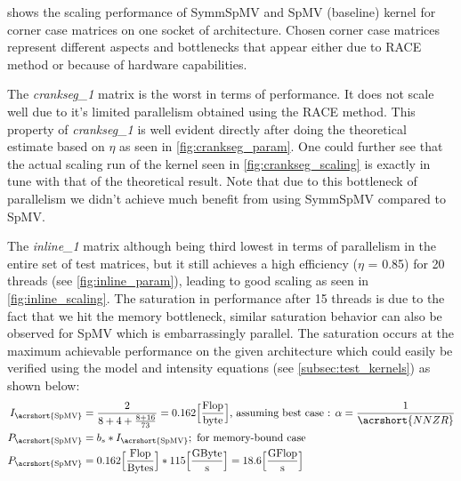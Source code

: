  shows the scaling performance of \acrshort{SymmSpMV} and \acrshort{SpMV} (baseline) kernel for corner case matrices on one socket of \SKX architecture. Chosen corner case matrices represent different aspects and bottlenecks that appear either due to \acrshort{RACE} method or because of hardware capabilities.

The \emph{crankseg\_1} matrix is the worst in terms of performance. It does not scale well due to it's limited parallelism obtained using the \acrshort{RACE} method. This property of \emph{crankseg\_1} is well evident directly after doing the theoretical estimate based on $\eta$ as  seen in \cref{fig:crankseg_param}. One could further see that the actual scaling run of the kernel seen in \cref{fig:crankseg_scaling} is exactly in tune with that of the theoretical result. Note that due to this bottleneck of parallelism we didn't achieve much benefit from using \acrshort{SymmSpMV} compared to \acrshort{SpMV}.

The \emph{inline\_1} matrix although being third lowest in terms of parallelism in the entire set of test matrices, but it still achieves a high efficiency ($\eta$ = 0.85) for 20 threads (see \cref{fig:inline_param}), leading to good scaling as seen in \cref{fig:inline_scaling}. The saturation in performance after 15 threads is due to the fact that we hit the memory bottleneck, similar saturation behavior can also be observed for \acrshort{SpMV} which is embarrassingly parallel. The saturation occurs at the maximum achievable performance on the given architecture which could easily be verified using the \roofline model \cite{Williams_roofline} and intensity equations (see \cref{subsec:test_kernels}) as shown below:
\begin{align*}
	I_\mathrm{\acrshort{SpMV}} &= \frac{2}{8+4+\frac{8+16}{73}} = 0.162 \fracUnit{Flop}{byte} \text{, assuming best case : $\alpha = \frac{1}{\acrshort{NNZR}}$}\\
	P_\mathrm{\acrshort{SpMV}} &= b_s*I_\mathrm{\acrshort{SpMV}}; \text{  for memory-bound case}\\
	P_\mathrm{\acrshort{SpMV}} &= 0.162\fracUnit{Flop}{Bytes}*115\fracUnit{GByte}{s} = 18.6 \fracUnit{GFlop}{s}\\
\end{align*}

